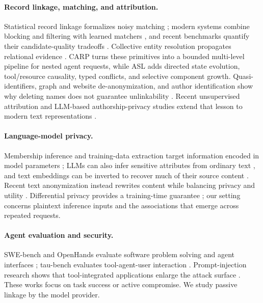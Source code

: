 \documentclass[letterpaper]{article} %
\newcommand{\carp}{\textsc{CARP}\xspace}
\newcommand{\asl}{\textsc{ASL}\xspace}
\begin{document}
\paragraph{Record linkage, matching, and attribution.}
Statistical record linkage formalizes noisy matching \cite{fellegi1969theory}; modern systems combine
blocking and filtering with learned matchers
\cite{christen2012survey,papadakis2020blocking,li2020ditto}, and recent benchmarks quantify their
candidate-quality tradeoffs \cite{neuhof2024benchmark}. Collective entity resolution propagates
relational evidence \cite{bhattacharya2007collective}. \carp turns these primitives into a bounded
multi-level pipeline for nested agent requests, while \asl adds directed state evolution,
tool/resource causality, typed conflicts, and selective component growth. Quasi-identifiers, graph
and website de-anonymization, and author identification show why deleting names does not guarantee
unlinkability
\cite{sweeney2002kanonymity,narayanan2009anonymizing,panchenko2016website,narayanan2012author}.
Recent unsupervised attribution and LLM-based authorship-privacy studies extend that lesson to modern
text representations \cite{bertocco2023unsupervised,nguyen2025authorship}.

\paragraph{Language-model privacy.}
Membership inference and training-data extraction target information encoded in model parameters
\cite{shokri2017membership,carlini2021extracting}; LLMs can also infer sensitive attributes from
ordinary text \cite{staab2024beyond}, and text embeddings can be inverted to recover much of their
source content \cite{morris2023embeddings}. Recent text anonymization instead rewrites content while
balancing privacy and utility \cite{yang2025anonymization}. Differential privacy provides a
training-time guarantee \cite{dwork2006calibrating}; our setting concerns plaintext inference inputs
and the associations that emerge across repeated requests.

\paragraph{Agent evaluation and security.}
SWE-bench and OpenHands evaluate software problem solving and agent interfaces
\cite{jimenez2023swebench,wang2024openhands}; tau-bench evaluates tool-agent-user interaction
\cite{yao2024taubench}. Prompt-injection research shows that tool-integrated applications enlarge the
attack surface \cite{greshake2023indirect,debenedetti2024agentdojo,yi2025promptinjection}. These works
focus on task success or active compromise. We study passive linkage by the model provider.
\end{document}
